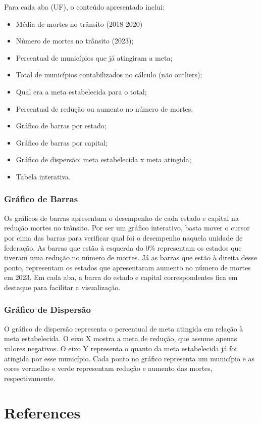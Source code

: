 \documentclass[
  letterpaper,
  DIV=11,
  numbers=noendperiod]{scrreprt}
\newlength{\cslhangindent}
\newenvironment{CSLReferences}[2] %
 {\begin{list}{}{%
  \setlength{\itemindent}{0pt}
  \setlength{\leftmargin}{0pt}
  \setlength{\parsep}{0pt}
  \ifodd #1
   \setlength{\leftmargin}{\cslhangindent}
   \setlength{\itemindent}{-1\cslhangindent}
  \fi
  \setlength{\itemsep}{#2\baselineskip}}}
 {\end{list}}
\begin{document}
Para cada aba (UF), o conteúdo apresentado inclui:

\begin{itemize}
\item
  Média de mortes no trânsito (2018-2020)
\item
  Número de mortes no trânsito (2023);
\item
  Percentual de municípios que já atingiram a meta;
\item
  Total de municípios contabilizados no cálculo (não outliers);
\item
  Qual era a meta estabelecida para o total;
\item
  Percentual de redução ou aumento no número de mortes;
\item
  Gráfico de barras por estado;
\item
  Gráfico de barras por capital;
\item
  Gráfico de dispersão: meta estabelecida x meta atingida;
\item
  Tabela interativa.
\end{itemize}

\subsection{Gráfico de Barras}\label{gruxe1fico-de-barras}

Os gráficos de barras apresentam o desempenho de cada estado e capital
na redução mortes no trânsito. Por ser um gráfico interativo, basta
mover o cursor por cima das barras para verificar qual foi o desempenho
naquela unidade de federação. As barras que estão à esquerda do 0\%
representam os estados que tiveram uma redução no número de mortes. Já
as barras que estão à direita desse ponto, representam os estados que
apresentaram aumento no número de mortes em 2023. Em cada aba, a barra
do estado e capital correspondentes fica em destaque para facilitar a
visualização.

\subsection{Gráfico de Dispersão}\label{gruxe1fico-de-dispersuxe3o}

O gráfico de dispersão representa o percentual de meta atingida em
relação à meta estabelecida. O eixo X mostra a meta de redução, que
assume apenas valores negativos. O eixo Y representa o quanto da meta
estabelecida já foi atingida por esse município. Cada ponto no gráfico
representa um município e as cores vermelho e verde representam redução
e aumento das mortes, respectivamente.


\chapter*{References}\label{references}


\label{refs}
\begin{CSLReferences}{0}{1}
\end{CSLReferences}
\end{document}
